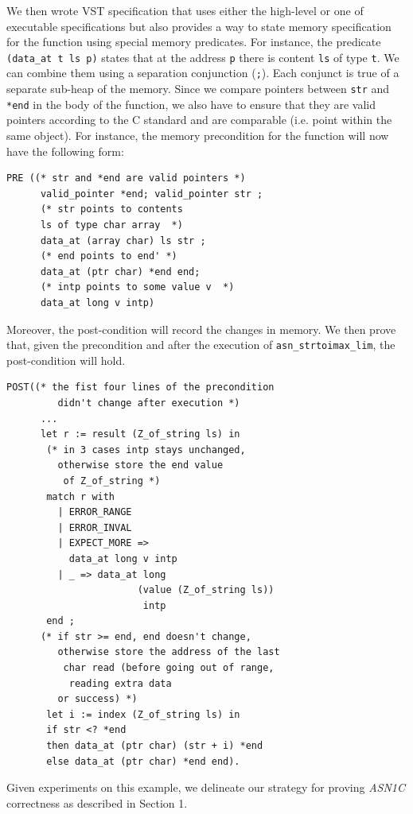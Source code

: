 \documentclass[10p,conference]{IEEEtran}
\begin{document}
 We then wrote VST specification that uses either the high-level
 or one of executable specifications but also provides a way to
 state memory specification for the function using special memory
 predicates. For instance, the predicate \texttt{(data\_at t ls p)}
 states that at the address \texttt{p} there is content \texttt{ls} of
 type \texttt{t}. We can combine them using a separation conjunction
 (\texttt{;}). Each conjunct is true of a separate sub-heap of the
 memory. Since we compare pointers between \texttt{str} and \texttt{*end} in the body of the function, we also have to ensure
 that they are valid pointers according to the C standard and are
 comparable (i.e. point within the same object). For instance, the
 memory precondition for the function will now have the following form:
\begin{lstlisting}[language=Coq]
PRE ((* str and *end are valid pointers *)
      valid_pointer *end; valid_pointer str ;
      (* str points to contents 
      ls of type char array  *)
      data_at (array char) ls str ; 
      (* end points to end' *)
      data_at (ptr char) *end end;
      (* intp points to some value v  *)
      data_at long v intp)
     \end{lstlisting}

     Moreover, the post-condition will record the changes in memory. We then
     prove that, given the precondition and after the execution of
     \texttt{asn\_strtoimax\_lim}, the post-condition will hold.
           
\begin{lstlisting}[language=Coq]
 POST((* the fist four lines of the precondition 
         didn't change after execution *)
      ... 
      let r := result (Z_of_string ls) in
       (* in 3 cases intp stays unchanged,
         otherwise store the end value
          of Z_of_string *)
       match r with 
         | ERROR_RANGE 
         | ERROR_INVAL 
         | EXPECT_MORE => 
           data_at long v intp
         | _ => data_at long 
                       (value (Z_of_string ls))
                        intp 
       end ;
      (* if str >= end, end doesn't change, 
         otherwise store the address of the last
          char read (before going out of range,
           reading extra data 
         or success) *)
       let i := index (Z_of_string ls) in
       if str <? *end
       then data_at (ptr char) (str + i) *end
       else data_at (ptr char) *end end).
\end{lstlisting}

Given experiments on this example, we delineate our strategy for proving
\emph{ASN1C} correctness as described in Section 1.
\end{document}
